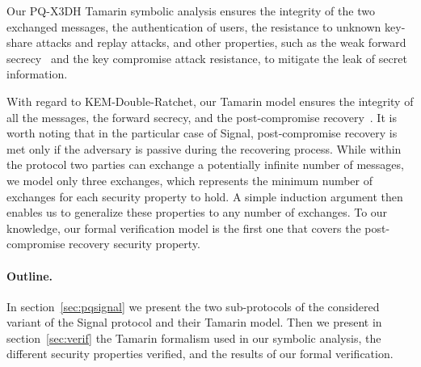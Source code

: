 Our PQ-X3DH Tamarin symbolic analysis ensures the integrity of the two exchanged messages, the authentication of users, the resistance to unknown key-share attacks and replay attacks, and other properties, such as the weak forward secrecy~\cite{DBLP:conf/crypto/Krawczyk05} and the key compromise attack resistance, to mitigate the leak of secret information.

With regard to KEM-Double-Ratchet, our Tamarin model ensures the integrity of all the messages, the forward secrecy, and the post-compromise recovery~\cite{EC:AlwCorDod19}. It is worth noting that in the particular case of Signal, post-compromise recovery is met only if the adversary is passive during the recovering process. While within the \dr protocol two parties can exchange a potentially infinite number of messages, we model only three exchanges, which represents the minimum number of exchanges for each security property to hold. A simple induction argument then enables us to generalize these properties to any number of exchanges. To our knowledge, our formal verification model is the first one that covers the post-compromise recovery security property.

\paragraph{Outline.} In section~\ref{sec:pqsignal} we present the two sub-protocols of the considered variant of the Signal protocol and their Tamarin model. Then we present in section~\ref{sec:verif} the Tamarin formalism used in our symbolic analysis, the different security properties verified, and the results of our formal verification.
